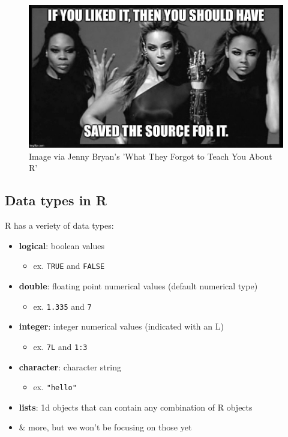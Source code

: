 \documentclass[
]{book}
\providecommand{\tightlist}{%
  \setlength{\itemsep}{0pt}\setlength{\parskip}{0pt}}
\begin{document}
\begin{figure}
\includegraphics[width=12.33in]{img/if-you-liked-it-you-should-have-saved-the-source-for-it} \caption{ Image via Jenny Bryan's 'What They Forgot to Teach You About R'}\label{fig:unnamed-chunk-9}
\end{figure}

\hypertarget{data-types-in-r}{%
\subsection*{Data types in R}\label{data-types-in-r}}

R has a veriety of data types:

\begin{itemize}
\tightlist
\item
  \textbf{logical}: boolean values

  \begin{itemize}
  \tightlist
  \item
    ex. \texttt{TRUE} and \texttt{FALSE}
  \end{itemize}
\item
  \textbf{double}: floating point numerical values (default numerical type)

  \begin{itemize}
  \tightlist
  \item
    ex. \texttt{1.335} and \texttt{7}
  \end{itemize}
\item
  \textbf{integer}: integer numerical values (indicated with an L)

  \begin{itemize}
  \tightlist
  \item
    ex. \texttt{7L} and \texttt{1:3}
  \end{itemize}
\item
  \textbf{character}: character string

  \begin{itemize}
  \tightlist
  \item
    ex. \texttt{"hello"}\\
  \end{itemize}
\item
  \textbf{lists}: 1d objects that can contain any combination of R objects
\item
  \& more, but we won't be focusing on those yet
\end{itemize}
\end{document}
